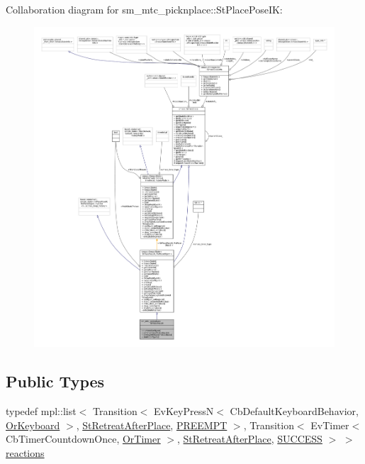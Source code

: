 Collaboration diagram for sm\+\_\+mtc\+\_\+picknplace\+:\+:St\+Place\+Pose\+IK\+:
\nopagebreak
\begin{figure}[H]
\begin{center}
\leavevmode
\includegraphics[width=350pt]{structsm__mtc__picknplace_1_1StPlacePoseIK__coll__graph}
\end{center}
\end{figure}
\subsection*{Public Types}
\begin{DoxyCompactItemize}
\item 
typedef mpl\+::list$<$ Transition$<$ Ev\+Key\+PressN$<$ Cb\+Default\+Keyboard\+Behavior, \hyperlink{classsm__mtc__picknplace_1_1OrKeyboard}{Or\+Keyboard} $>$, \hyperlink{structsm__mtc__picknplace_1_1StRetreatAfterPlace}{St\+Retreat\+After\+Place}, \hyperlink{classPREEMPT}{P\+R\+E\+E\+M\+PT} $>$, Transition$<$ Ev\+Timer$<$ Cb\+Timer\+Countdown\+Once, \hyperlink{classsm__mtc__picknplace_1_1OrTimer}{Or\+Timer} $>$, \hyperlink{structsm__mtc__picknplace_1_1StRetreatAfterPlace}{St\+Retreat\+After\+Place}, \hyperlink{classSUCCESS}{S\+U\+C\+C\+E\+SS} $>$ $>$ \hyperlink{structsm__mtc__picknplace_1_1StPlacePoseIK_a81b4f8ab24331080f42d4599f1765ad3}{reactions}
\end{DoxyCompactItemize}
